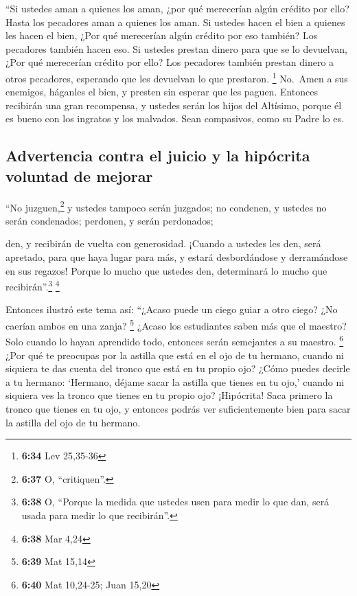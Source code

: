  ``Si ustedes aman a quienes los aman, ¿por qué
merecerían algún crédito por ello? Hasta los pecadores aman a quienes
los aman.  Si ustedes hacen el bien a quienes les hacen
el bien, ¿Por qué merecerían algún crédito por eso también? Los
pecadores también hacen eso.  Si ustedes prestan dinero
para que se lo devuelvan, ¿Por qué merecerían crédito por ello? Los
pecadores también prestan dinero a otros pecadores, esperando que les
devuelvan lo que prestaron. \footnote{\textbf{6:34} Lev 25,35-36}
 No.~Amen a sus enemigos, háganles el bien, y presten sin
esperar que les paguen. Entonces recibirán una gran recompensa, y
ustedes serán los hijos del Altísimo, porque él es bueno con los
ingratos y los malvados.  Sean compasivos, como su Padre
lo es.

\hypertarget{advertencia-contra-el-juicio-y-la-hipuxf3crita-voluntad-de-mejorar}{%
\subsection{Advertencia contra el juicio y la hipócrita voluntad de
mejorar}\label{advertencia-contra-el-juicio-y-la-hipuxf3crita-voluntad-de-mejorar}}

 ``No juzguen,\footnote{\textbf{6:37} O, ``critiquen''.}
y ustedes tampoco serán juzgados; no condenen, y ustedes no serán
condenados; perdonen, y serán perdonados;

 den, y recibirán de vuelta con generosidad. ¡Cuando a
ustedes les den, será apretado, para que haya lugar para más, y estará
desbordándose y derramándose en sus regazos! Porque lo mucho que ustedes
den, determinará lo mucho que recibirán''.\footnote{\textbf{6:38} O,
  ``Porque la medida que ustedes usen para medir lo que dan, será usada
  para medir lo que recibirán''.} \footnote{\textbf{6:38} Mar 4,24}

 Entonces ilustró este tema así: ``¿Acaso puede un ciego
guiar a otro ciego? ¿No caerían ambos en una zanja? \footnote{\textbf{6:39}
  Mat 15,14}  ¿Acaso los estudiantes saben más que el
maestro? Solo cuando lo hayan aprendido todo, entonces serán semejantes
a su maestro. \footnote{\textbf{6:40} Mat 10,24-25; Juan 15,20}
 ¿Por qué te preocupas por la astilla que está en el ojo
de tu hermano, cuando ni siquiera te das cuenta del tronco que está en
tu propio ojo?  ¿Cómo puedes decirle a tu hermano:
`Hermano, déjame sacar la astilla que tienes en tu ojo,' cuando ni
siquiera ves la tronco que tienes en tu propio ojo? ¡Hipócrita! Saca
primero la tronco que tienes en tu ojo, y entonces podrás ver
suficientemente bien para sacar la astilla del ojo de tu hermano.

